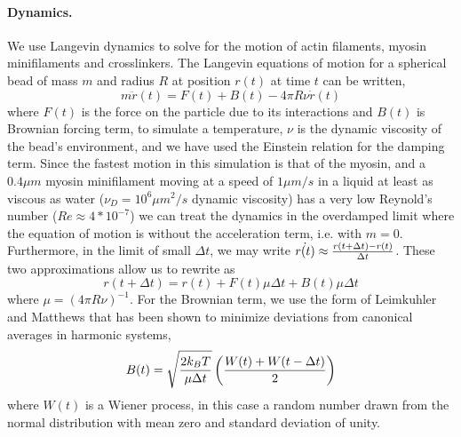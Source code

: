 \documentclass[11pt]{article}
\begin{document}
\paragraph{{\bf Dynamics.}} We use Langevin dynamics to solve for the motion of actin filaments, myosin minifilaments and crosslinkers.
The Langevin equations of motion for a spherical bead of
mass $m$ and radius $R$ at position $r(t)$ at time $t$ can be written,
\begin{equation}
  m\ddot{r}(t) = F(t) + B(t) - 4\pi R\nu \dot{r}(t)
  \label{eqn:lang}
\end{equation} 
where $F(t)$ is the force on the particle due to its interactions and $B(t)$ is Brownian forcing term, to simulate a temperature, $\nu$ is the dynamic viscosity of the bead's
environment, and we have used the Einstein relation for the damping term.  
Since the fastest motion in this simulation is that of the myosin, and a $0.4\mu m$ myosin minifilament moving at
a speed of $1\mu m/s$ in a liquid at least as viscous as water ($\nu_D=10^6\mu m^2/s$ dynamic viscosity) has a very low Reynold's
number ($Re \approx 4*10^{-7}$) we can treat the dynamics in the overdamped limit where the equation of motion is  without the acceleration term, i.e. with $m=0$.
Furthermore, in the limit of small $\Delta t$, we may write $\dot{r(t)} \approx {r(t+\Delta t)-r(t)\over \Delta t}$. These two
approximations allow us to rewrite  as 
\begin{equation}  
  r(t+\Delta t) = r(t) + F(t)\mu \Delta t + B(t) \mu \Delta t
\label{eqn:overdamped}
\end{equation}
where $\mu = (4\pi R\nu)^{-1}$. For the Brownian term, we use the form of Leimkuhler and Matthews \cite{leimkuhler2012,leimkuhler2013} that has
been shown to minimize deviations from canonical averages in harmonic systems,
\begin{equation}
  B(t)=\sqrt{2k_BT\over\mu \Delta t}\left({W(t)+W(t-\Delta t)\over2}\right)
  \label{eqn:baoab_brownian}
\end{equation} 
where $W(t)$ is a Wiener process, in this case a random number drawn from the normal distribution with mean zero and standard deviation of unity.
\end{document}
